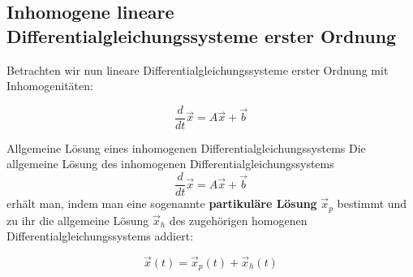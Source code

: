 \clearpage
\subsection{Inhomogene lineare Differentialgleichungssysteme erster Ordnung}

Betrachten wir nun lineare Differentialgleichungssysteme erster Ordnung mit Inhomogenitäten:

\[
    \frac{d}{dt}\vec{x}=A\vec{x}+\vec{b}
\]

\begin{satz}{Allgemeine Lösung eines inhomogenen Differentialgleichungssystems}{}
    Die allgemeine Lösung des inhomogenen Differentialgleichungssystems
    \[
        \frac{d}{dt}\vec{x}=A\vec{x}+\vec{b}
    \]
    erhält man, indem man eine sogenannte \textbf{partikuläre Lösung}
    \(\vec{x}_p\) bestimmt und zu ihr die allgemeine Lösung
    \(\vec{x}_h\) des zugehörigen homogenen Differentialgleichungssystems
    addiert:

    \[
        \vec{x}(t)=\vec{x}_p(t)+\vec{x}_h(t)
    \]
\end{satz}

